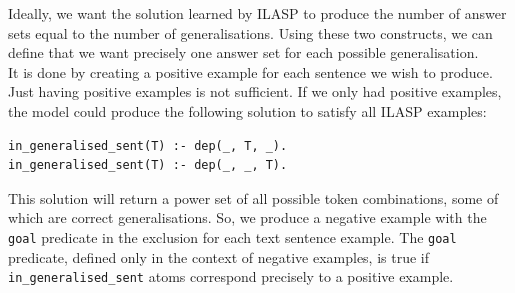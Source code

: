 Ideally, we want the solution learned by ILASP to produce the number of answer sets equal to the number of generalisations.
Using these two constructs, we can define that we want precisely one answer set for each possible generalisation. \\
It is done by creating a positive example for each sentence we wish to produce. 
Just having positive examples is not sufficient.
If we only had positive examples, the model could produce the following solution to satisfy all ILASP examples:
\begin{verbatim}
in_generalised_sent(T) :- dep(_, T, _).
in_generalised_sent(T) :- dep(_, _, T).
\end{verbatim}
This solution will return a power set of all possible token combinations, some of which are correct generalisations.
So, we produce a negative example with the \verb_goal_ predicate in the exclusion for each text sentence example.
The \verb_goal_ predicate, defined only in the context of negative examples, is true if \verb+in_generalised_sent+ atoms correspond precisely to a positive example.


